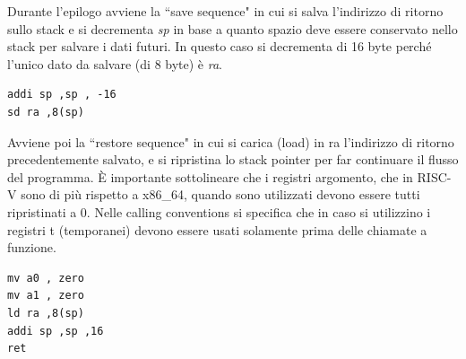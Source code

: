Durante l'epilogo avviene la ``save sequence" in cui si salva l'indirizzo di ritorno sullo stack e si decrementa \textit{sp} in base a quanto spazio deve essere conservato nello stack per salvare i dati futuri. In questo caso si decrementa di 16 byte perché l'unico dato da salvare (di 8 byte) è \textit{ra}.
\begin{verbatim}
addi sp ,sp , -16
sd ra ,8(sp)
\end{verbatim}
Avviene poi la ``restore sequence" in cui si carica (load) in ra l'indirizzo di ritorno precedentemente salvato, e si ripristina lo stack pointer per far continuare il flusso del programma. È importante sottolineare che i registri argomento, che in RISC-V sono di più rispetto a x86\_64, quando sono utilizzati devono essere tutti ripristinati a 0. Nelle calling conventions si specifica che in caso si utilizzino i registri t (temporanei) devono essere usati solamente prima delle chiamate a funzione.
\begin{verbatim}
mv a0 , zero
mv a1 , zero
ld ra ,8(sp)
addi sp ,sp ,16
ret
\end{verbatim}
